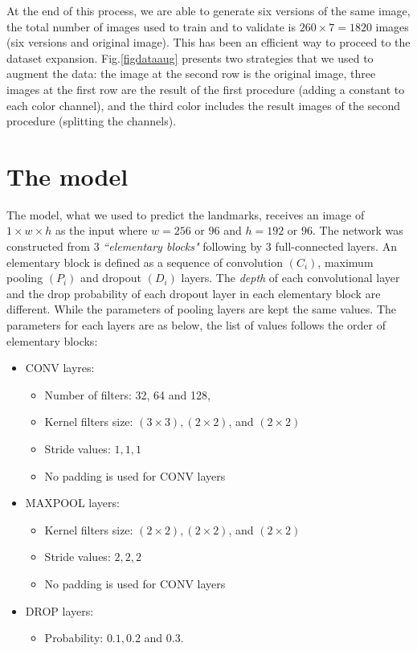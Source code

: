 \documentclass[12pt,a4paper]{article}
\begin{document}
At the end of this process, we are able to generate six versions of the same image, the total number of images used to train and to validate is
$260 \times 7 = 1820$ images (six versions and original image). This
has been an efficient way to proceed to the dataset expansion. Fig.\ref{figdataaug} presents two strategies that we used to augment the data: the image at the second row is the original image, three images at the first row are the result of the first procedure (adding a constant to each color channel), and the third color includes the result images of the second procedure (splitting the channels).

\section{The model}
\label{secarch}
The model, what we used to predict the landmarks, receives an image of $1 \times w \times h$ as the input where $w = 256$ or $96$ and $h = 192$ or $96$. The network was constructed from $3$ \textit{``elementary blocks"} following by $3$ full-connected layers. An elementary block is defined as a sequence of convolution $(C_i)$, maximum pooling $(P_i)$ and dropout $(D_i)$ layers. The \textit{depth} of each convolutional layer and the drop probability of each dropout layer in each elementary block are different. While the parameters of pooling layers are kept the same values. The parameters for each layers are as below, the list of values follows the order of elementary blocks:
\begin{itemize}[nosep,label=\footnotesize$\bullet$]
	\item CONV layres:
	\begin{itemize}[nosep]
		\item Number of filters: 32, 64 and 128,
		\item Kernel filters size: $(3 \times 3), (2 \times 2)$, and $(2 \times 2)$
		\item Stride values: $1,1,1$
		\item No padding is used for CONV layers
	\end{itemize}
	\item MAXPOOL layers:
	\begin{itemize}[nosep]
		\item Kernel filters size: $(2 \times 2), (2 \times 2)$, and $(2 \times 2)$
		\item Stride values: $2,2,2$
		\item No padding is used for CONV layers
	\end{itemize}
	\item DROP layers:
	\begin{itemize}
		\item Probability: $0.1, 0.2$ and $0.3$.
	\end{itemize}
\end{itemize}
\end{document}
